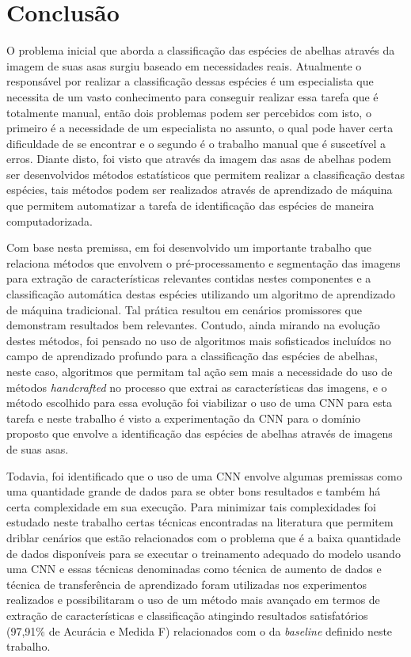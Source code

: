 \documentclass[
	12pt,				%
	oneside,			%
	a4paper,			%
	english,			%
	brazil				%
	]{abntex2ppgsi}
\begin{document}
\chapter{Conclusão}
O problema inicial que aborda a classificação das espécies de abelhas através da imagem de suas asas surgiu baseado em necessidades reais. Atualmente o responsável por realizar a classificação dessas espécies é um especialista que necessita de um vasto conhecimento para conseguir realizar essa tarefa que é totalmente manual, então dois problemas podem ser percebidos com isto, o primeiro é a necessidade de um especialista no assunto, o qual pode haver certa dificuldade de se encontrar e o segundo é o trabalho manual que é suscetível a erros. Diante disto, foi visto que através da imagem das asas de abelhas podem ser desenvolvidos métodos estatísticos que permitem realizar a classificação destas espécies, tais métodos podem ser realizados através de aprendizado de máquina que permitem automatizar a tarefa de identificação das espécies de maneira computadorizada. 

Com base nesta premissa, em  foi desenvolvido um importante trabalho que relaciona métodos que envolvem o pré-processamento e segmentação das imagens para extração de características relevantes contidas nestes componentes e a classificação automática destas espécies utilizando um algoritmo de aprendizado de máquina tradicional. Tal prática resultou em cenários promissores que demonstram resultados bem relevantes. Contudo, ainda mirando na evolução destes métodos, foi pensado no uso de algoritmos mais sofisticados incluídos no campo de aprendizado profundo para a classificação das espécies de abelhas, neste caso, algoritmos que permitam tal ação sem mais a necessidade do uso de métodos \textit{handcrafted} no processo que extrai as características das imagens, e o método escolhido para essa evolução foi viabilizar o uso de uma CNN para esta tarefa e neste trabalho é visto a experimentação da CNN para o domínio proposto que envolve a identificação das espécies de abelhas através de imagens de suas asas. 

Todavia, foi identificado que o uso de uma CNN envolve algumas premissas como uma quantidade grande de dados para se obter bons resultados e também há certa complexidade em sua execução. Para minimizar tais complexidades foi estudado neste trabalho certas técnicas encontradas na literatura que permitem driblar cenários que estão relacionados com o problema que é a baixa quantidade de dados disponíveis para se executar o treinamento adequado do modelo usando uma CNN e essas técnicas denominadas como técnica de aumento de dados e técnica de transferência de aprendizado foram utilizadas nos experimentos realizados e possibilitaram o uso de um método mais avançado em termos de extração de características e classificação atingindo resultados satisfatórios (97,91\% de Acurácia e Medida F) relacionados com o da \textit{baseline} definido neste trabalho.
\end{document}
